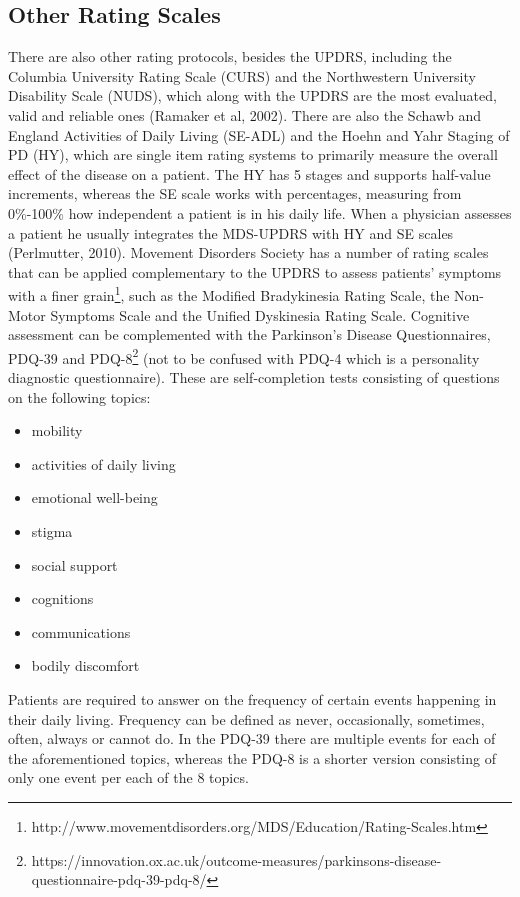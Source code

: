 
\subsection{Other Rating Scales}
\label{subsec:otherScales}
There are also other rating protocols, besides the \gls{UPDRS}, including the Columbia University Rating Scale (\gls{CURS}) and the Northwestern University Disability Scale (\gls{NUDS}), which along with the \gls{UPDRS} are the most evaluated, valid and reliable ones (Ramaker et al, 2002). There are also the Schawb and England Activities of Daily Living (\gls{SE}-ADL) and the Hoehn and Yahr Staging of \gls{PD} (\gls{HY}), which are single item rating systems to primarily measure the overall effect of the disease on a patient. The \gls{HY} has 5 stages and supports half-value increments, whereas the \gls{SE} scale works with percentages, measuring from 0\%-100\% how independent a patient is in his daily life. When a physician assesses a patient he usually integrates the \gls{MDS}-\gls{UPDRS} with \gls{HY} and \gls{SE} scales (Perlmutter, 2010). Movement Disorders Society has a number of rating scales that can be applied complementary to the \gls{UPDRS} to assess patients' symptoms with a finer grain\footnote{http://www.movementdisorders.org/MDS/Education/Rating-Scales.htm}, such as the Modified Bradykinesia Rating Scale, the Non-Motor Symptoms Scale and the Unified Dyskinesia Rating Scale.
Cognitive assessment can be complemented with the Parkinson's Disease Questionnaires, \gls{PDQ}-39 and \gls{PDQ}-8\footnote{https://innovation.ox.ac.uk/outcome-measures/parkinsons-disease-questionnaire-pdq-39-pdq-8/} (not to be confused with PDQ-4 which is a personality diagnostic questionnaire). These are self-completion tests consisting of questions on the following topics:

\begin{itemize}
\item mobility
\item activities of daily living
\item emotional well-being
\item stigma
\item social support
\item cognitions
\item communications
\item bodily discomfort
\end{itemize}

Patients are required to answer on the frequency of certain events happening in their daily living. Frequency can be defined as never, occasionally, sometimes, often, always or cannot do. In the \gls{PDQ}-39 there are multiple events for each of the aforementioned topics, whereas the \gls{PDQ}-8 is a shorter version consisting of only one event per each of the 8 topics.

